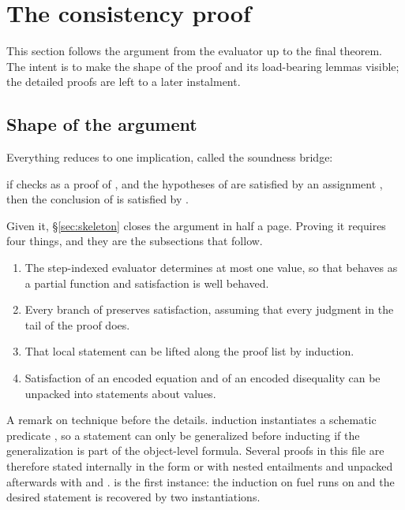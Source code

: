 \section{The consistency proof}
\label{sec:proof}

This section follows the argument from the evaluator up to the final theorem.
The intent is to make the shape of the proof and its load-bearing lemmas
visible; the detailed proofs are left to a later instalment.

\subsection{Shape of the argument}

Everything reduces to one implication, called the soundness bridge:

\begin{center}
if  checks as a proof of , and the hypotheses of  are
satisfied by an assignment , then the conclusion of  is satisfied
by .
\end{center}

\noindent
Given it, \S\ref{sec:skeleton} closes the argument in half a page.  Proving it
requires four things, and they are the subsections that follow.

\begin{enumerate}
\item The step-indexed evaluator determines at most one value, so that
       behaves as a partial function and satisfaction is well
      behaved.
\item Every branch of  preserves satisfaction, assuming that
      every judgment in the tail of the proof does.
\item That local statement can be lifted along the proof list by induction.
\item Satisfaction of an encoded equation and of an encoded disequality can be
      unpacked into statements about values.
\end{enumerate}

\noindent
A remark on technique before the details.  \QGA{} induction instantiates a
schematic predicate , so a statement can only be generalized before
inducting if the generalization is part of the object-level formula.  Several
proofs in this file are therefore stated internally in the form
 or with nested entailments  and unpacked
afterwards with  and .   is the
first instance: the induction on fuel runs on 
and the desired statement is recovered by two instantiations.

